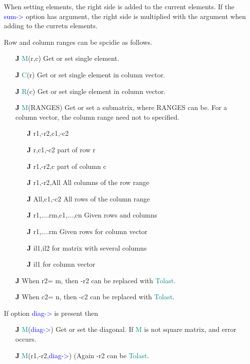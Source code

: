 \begin{changemargin}{3cm}{0cm}
\noindent  When setting elements, the right side is added to the current elements. If the
\textcolor{blue}{sum->} option has argument, the right side is multiplied with the argument when adding to the curretn elements.
\end {changemargin}
\hline
\vspace{0.2cm}
Row and column ranges can be spcidie as follows.
\begin{itemize}
\item[\textbf{J}\.] \textcolor{teal}{M}(r,c) \tabto{5cm} Get or set single element.
\item[\textbf{J}\.] \textcolor{teal}{C}(r)  \tabto{5cm} Get or set single element in column vector.
\item[\textbf{J}\.] \textcolor{teal}{R}(c) \tabto{5cm} Get or set single element in column vector.
\item[\textbf{J}\.] \textcolor{teal}{M}(RANGES) \tabto{5cm} Get or set a submatrix, where RANGES
can be. For a column vector, the column range need not to specified.
\begin{itemize}
\item[\textbf{J}\.] r1,-r2,c1,-c2
\item[\textbf{J}\.] r,c1,-c2  \tabto{5cm} part of row r
\item[\textbf{J}\.] r1,-r2,c	\tabto{5cm} part of column c
\item[\textbf{J}\.] r1,-r2,All  \tabto{5cm} All columns of the row range
\item[\textbf{J}\.] All,c1,-c2  \tabto{5cm} All rows of the column range
\item[\textbf{J}\.] {r1,....rm},{c1,...,cn}  \tabto{5cm} Given rows and columns
\item[\textbf{J}\.] {r1,....rm}  \tabto{5cm} Given rows for column vector
\item[\textbf{J}\.] il1,il2   \tabto{5cm} for matrix with several columns
\item[\textbf{J}\.] il1   \tabto{5cm} for column vector
\end{itemize}
\item[\textbf{J}\.] When r2= m, then -r2 can be replaced with \textcolor{teal}{Tolast}.
\item[\textbf{J}\.] When c2= n, then -c2 can be replaced with \textcolor{teal}{Tolast}.
\end{itemize}
If option \textcolor{blue}{diag->} is present then
\begin{itemize}
\item[\textbf{J}\.] \textcolor{teal}{M}(\textcolor{blue}{diag->}) Get or set the diagonal. If \textcolor{teal}{M} is not square matrix, and error
occurs.
\item[\textbf{J}\.] \textcolor{teal}{M}(r1,-r2,\textcolor{blue}{diag->}) (Again -r2 can be \textcolor{teal}{Tolast}.
\end{itemize}
